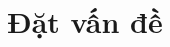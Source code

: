 \documentclass[../DoAn.tex]{subfiles}
\begin{document}





\section{Đặt vấn đề}
\label{section:1.1}
\end{document}
